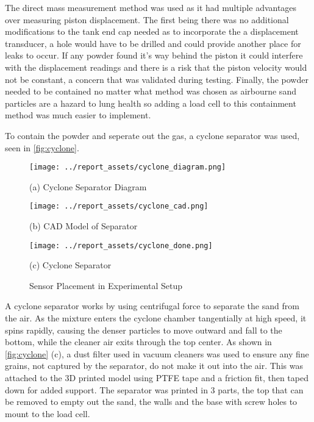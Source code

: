 The direct mass measurement method was used as it had multiple advantages over measuring piston displacement. The first being there was no additional modifications to the tank end cap needed as to incorporate the a displacement transducer, a hole would have to be drilled and could provide another place for leaks to occur. If any powder found it's way behind the piston it could interfere with the displacement readings and there is a risk that the piston velocity would not be constant, a concern that was validated during testing. Finally, the powder needed to be contained no matter what method was chosen as airbourne sand particles are a hazard to lung health so adding a load cell to this containment method was much easier to implement.

To contain the powder and seperate out the gas, a cyclone separator was used, seen in \autoref{fig:cyclone}.
\begin{figure}[htbp]
    \centering

    \begin{minipage}{0.3\textwidth}
        \centering
        \texttt{[image: ../report\_assets/cyclone\_diagram.png]}
        \caption*{(a) Cyclone Separator Diagram}
    \end{minipage}
    \hfill
    \begin{minipage}{0.3\textwidth}
        \centering
        \texttt{[image: ../report\_assets/cyclone\_cad.png]}
        \caption*{(b) CAD Model of Separator}
    \end{minipage}
    \hfill
    \begin{minipage}{0.3\textwidth}
        \centering
        \texttt{[image: ../report\_assets/cyclone\_done.png]}
        \caption*{(c) Cyclone Separator}
    \end{minipage}
    \caption{Sensor Placement in Experimental Setup}\label{fig:cyclone}
\end{figure}
A cyclone separator works by using centrifugal force to separate the sand from the air. As the mixture enters the cyclone chamber tangentially at high speed, it spins rapidly, causing the denser particles to move outward and fall to the bottom, while the cleaner air exits through the top center. As shown in \autoref{fig:cyclone} (c), a dust filter used in vacuum cleaners was used to ensure any fine grains, not captured by the separator, do not make it out into the air. This was attached to the 3D printed model using PTFE tape and a friction fit, then taped down for added support. The separator was printed in 3 parts, the top that can be removed to empty out the sand, the walls and the base with screw holes to mount to the load cell.

